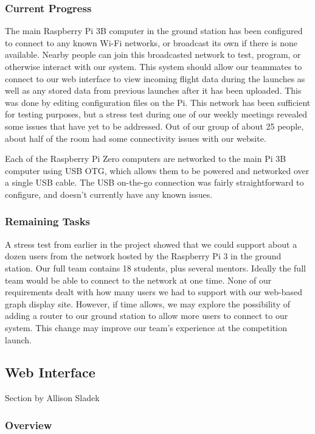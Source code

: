\documentclass[onecolumn, draftclsnofoot, 10pt, compsoc]{IEEEtran}
\begin{document}
\subsubsection{Current Progress}
The main Raspberry Pi 3B computer in the ground station has been configured to connect to any known Wi-Fi networks, or broadcast its own if there is none available. 
Nearby people can join this broadcasted network to test, program, or otherwise interact with our system. 
This system should allow our teammates to connect to our web interface to view incoming flight data during the launches as well as any stored data from previous launches after it has been uploaded.
This was done by editing configuration files on the Pi. 
This network has been sufficient for testing purposes, but a stress test during one of our weekly meetings revealed some issues that have yet to be addressed. 
Out of our group of about 25 people, about half of the room had some connectivity issues with our website. 

Each of the Raspberry Pi Zero computers are networked to the main Pi 3B computer using USB OTG, which allows them to be powered and networked over a single USB cable. The USB on-the-go connection was fairly straightforward to configure, and doesn’t currently have any known issues.


\subsubsection{Remaining Tasks}
A stress test from earlier in the project showed that we could support about a dozen users from the network hosted by the Raspberry Pi 3 in the ground station.
Our full team contains 18 students, plus several mentors.
Ideally the full team would be able to connect to the network at one time.
None of our requirements dealt with how many users we had to support with our web-based graph display site. 
However, if time allows, we may explore the possibility of adding a router to our ground station to allow more users to connect to our system. 
This change may improve our team's experience at the competition launch.
\subsection{Web Interface}
Section by Allison Sladek
\subsubsection{Overview}
\end{document}
